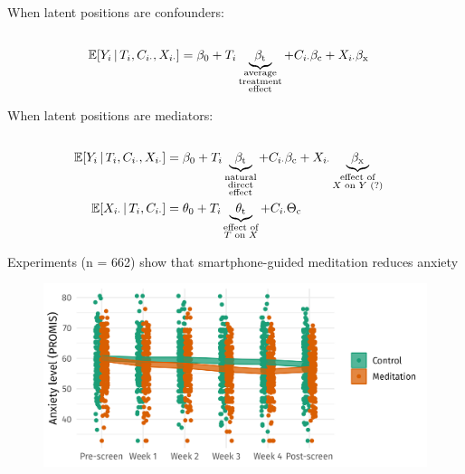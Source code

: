 \documentclass[aspectratio=169]{beamer}
\theoremstyle{remark}
\begin{document}
\begin{frame}
    When latent positions are confounders:
    \begin{equation*}
        \begin{aligned}                                                    \\
            \E[T_i, \C_{i \cdot}, \X_{i \cdot}]{Y_i}
             & = \betazero + T_i \underbrace{\betat}_{\substack{\text{average} \\ \text{treatment} \\ \text{effect}}} + \C_{i \cdot} \betac + \X_{i \cdot} \betax
        \end{aligned}
    \end{equation*}

    When latent positions are mediators:
    \begin{equation*}
        \begin{aligned}                                                    \\
            \E[T_i, \C_{i \cdot}, \X_{i \cdot}]{Y_i}
             & = \betazero + T_i \underbrace{\betat}_{\substack{\text{natural}     \\ \text{direct} \\ \text{effect}}} + \C_{i \cdot} \betac + \X_{i \cdot} \underbrace{\betax}_{\substack{\text{effect of} \\ \text{$X$ on $Y$ (?)}}}  \\
            \E[T_i, \C_{i \cdot}]{\X_{i \cdot}}
             & = \thetazero + T_i \underbrace{\thetat}_{\substack{\text{effect of} \\ \text{$T$ on $X$}}}  + \C_{i \cdot} \Thetac
        \end{aligned}
    \end{equation*}
\end{frame}

\begin{frame}{Experiments (n = 662) show that smartphone-guided meditation reduces anxiety}
    \begin{figure}
        \centering
        \includegraphics{./figures/ate.png}
    \end{figure}
\end{frame}
\end{document}
